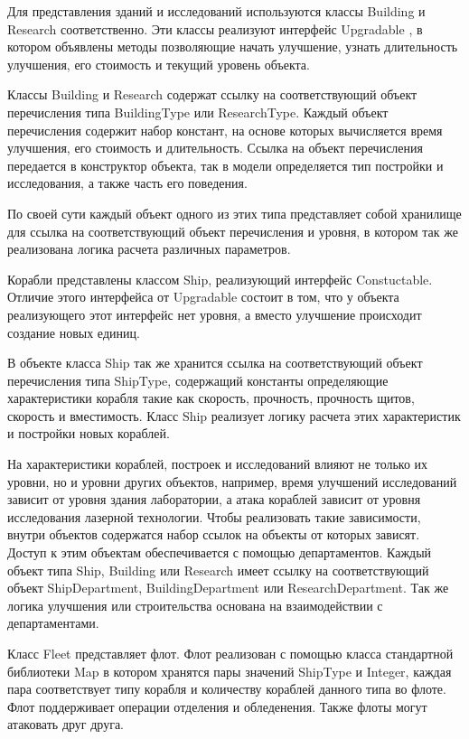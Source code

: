 Для представления зданий и исследований используются классы Building  и Research  соответственно. Эти классы реализуют интерфейс Upgradable , в котором объявлены методы позволяющие начать улучшение, узнать длительность улучшения, его стоимость и текущий уровень объекта.

Классы Building и Research содержат ссылку на соответствующий объект перечисления типа BuildingType   или
 ResearchType. Каждый объект перечисления содержит набор констант, на основе которых вычисляется время улучшения, его стоимость и длительность. Ссылка на объект перечисления передается в конструктор объекта, так в модели определяется тип постройки и исследования, а также часть его поведения.

По своей сути каждый объект одного из этих типа представляет собой хранилище для ссылка на соответствующий объект перечисления и уровня, в котором так же реализована логика расчета различных параметров. 

Корабли представлены классом Ship, реализующий интерфейс Constuctable. Отличие этого интерфейса от Upgradable состоит в том, что у объекта реализующего этот интерфейс нет уровня, а вместо улучшение происходит создание новых единиц.

В объекте класса Ship так же хранится ссылка на соответствующий объект перечисления типа ShipType, содержащий константы определяющие характеристики корабля такие как скорость, прочность, прочность щитов, скорость и вместимость. Класс Ship реализует логику расчета этих характеристик и постройки новых кораблей.

На характеристики кораблей, построек и исследований влияют не только их уровни, но и уровни других объектов, например, время улучшений исследований зависит от уровня здания лаборатории, а атака кораблей зависит от уровня исследования лазерной технологии. Чтобы реализовать такие зависимости, внутри объектов содержатся набор ссылок на объекты от которых зависят. Доступ к этим объектам обеспечивается с помощью департаментов. Каждый объект типа Ship, Building или Research имеет ссылку на соответствующий объект ShipDepartment, BuildingDepartment или ResearchDepartment. Так же логика улучшения или строительства основана на взаимодействии с департаментами.

Класс Fleet представляет флот. Флот реализован с помощью класса стандартной библиотеки Map в котором хранятся пары значений ShipType и Integer, каждая пара соответствует типу корабля и количеству кораблей данного типа во флоте. Флот поддерживает операции отделения и обледенения. Также флоты могут атаковать друг друга.

